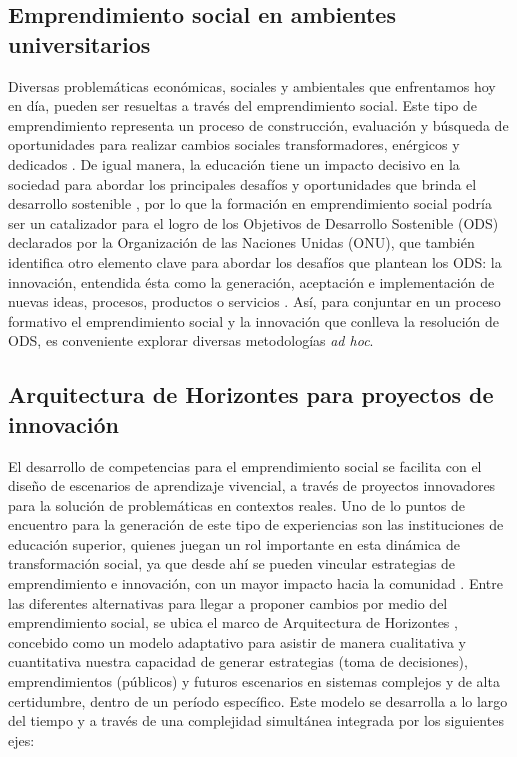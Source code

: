 \documentclass[spanish]{textolivre}
\begin{document}
\subsection{Emprendimiento social en ambientes universitarios}
Diversas problemáticas económicas, sociales y ambientales que enfrentamos hoy en día, pueden ser resueltas a través del emprendimiento social. Este tipo de emprendimiento representa un proceso de construcción, evaluación y búsqueda de oportunidades para realizar cambios sociales transformadores, enérgicos y dedicados \cite{utomo2019}. De igual manera, la educación tiene un impacto decisivo en la sociedad para abordar los principales desafíos y oportunidades que brinda el desarrollo sostenible \cite{sanchez-hernandez2019}, por lo que la formación en emprendimiento social podría ser  un catalizador para el logro de los Objetivos de Desarrollo Sostenible (ODS) declarados por la Organización de las Naciones Unidas (ONU), que también identifica otro elemento clave para abordar los desafíos que plantean los ODS: la innovación, entendida ésta como la generación, aceptación e implementación de nuevas ideas, procesos, productos o servicios \cite{filser2019}. Así, para conjuntar en un proceso formativo el emprendimiento social y la innovación que conlleva la resolución de ODS, es conveniente explorar diversas metodologías \emph{ad hoc}.

\subsection{Arquitectura de Horizontes para proyectos de innovación}
El desarrollo de competencias para el emprendimiento social se facilita con el diseño de escenarios de aprendizaje vivencial, a través de proyectos innovadores para la solución de problemáticas en contextos reales. Uno de lo puntos de encuentro para la generación de este tipo de experiencias son las instituciones de educación superior, quienes juegan un rol importante en esta dinámica de transformación social, ya que desde ahí se pueden vincular estrategias de emprendimiento e innovación, con un mayor impacto hacia la comunidad \cite{portuguez_castro2019}. Entre las diferentes alternativas para llegar a proponer cambios por medio del emprendimiento social, se ubica el marco de Arquitectura de Horizontes \cite{barroso2019}, concebido como un modelo adaptativo para asistir de manera cualitativa y cuantitativa nuestra capacidad de generar estrategias (toma de decisiones), emprendimientos (públicos) y futuros escenarios en sistemas complejos y de alta certidumbre, dentro de un período específico. Este modelo se desarrolla a lo largo del tiempo y a través de una complejidad simultánea integrada por los siguientes ejes:
\end{document}
